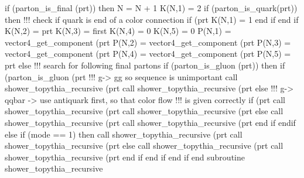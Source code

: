     if (parton_is_final (prt)) then
       N = N + 1
       K(N,1) = 2
       if (parton_is_quark(prt)) then
          !!! check if quark is end of a color connection
          if (prt%
             K(N,1) = 1
          end if
       end if
       K(N,2) = prt%
       K(N,3) = first
       K(N,4) = 0
       K(N,5) = 0
       P(N,1) = vector4_get_component (prt%
       P(N,2) = vector4_get_component (prt%
       P(N,3) = vector4_get_component (prt%
       P(N,4) = vector4_get_component (prt%
       P(N,5) = prt%
    else
       !!! search for following final partons
       if (parton_is_gluon (prt)) then
          if (parton_is_gluon (prt%
             !!! g-> gg so sequence is unimportant
             call shower_topythia_recursive (prt%
             call shower_topythia_recursive (prt%
          else
             !!! g-> qqbar -> use antiquark first, so that color flow
             !!!     is given correctly
             if (prt%
                call shower_topythia_recursive (prt%
                call shower_topythia_recursive (prt%
             else
                call shower_topythia_recursive (prt%
                call shower_topythia_recursive (prt%
             end if
          endif
       else
          if (mode == 1) then
             call shower_topythia_recursive (prt%
             call shower_topythia_recursive (prt%
          else
             call shower_topythia_recursive (prt%
             call shower_topythia_recursive (prt%
          end if
       end if
    end if
  end subroutine shower_topythia_recursive

